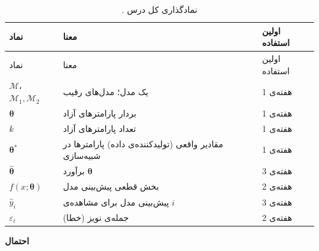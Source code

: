 \begin{longtable}[]{@{}
  >{\raggedright\arraybackslash}p{}
  >{\raggedright\arraybackslash}p{}
  >{\raggedright\arraybackslash}p{}@{}}
\caption{. نمادگذاری کل درس}\tabularnewline
\toprule\noalign{}
\begin{minipage}[b]{\linewidth}\raggedright
نماد
\end{minipage} & \begin{minipage}[b]{\linewidth}\raggedright
معنا
\end{minipage} & \begin{minipage}[b]{\linewidth}\raggedright
اولین استفاده
\end{minipage} \\
\midrule\noalign{}
\endfirsthead
\toprule\noalign{}
\begin{minipage}[b]{\linewidth}\raggedright
نماد
\end{minipage} & \begin{minipage}[b]{\linewidth}\raggedright
معنا
\end{minipage} & \begin{minipage}[b]{\linewidth}\raggedright
اولین استفاده
\end{minipage} \\
\midrule\noalign{}
\endhead
\bottomrule\noalign{}
\endlastfoot
\(\mathcal{M}\)، \(\mathcal{M}_1, \mathcal{M}_2\) & یک مدل؛ مدل‌های رقیب
& هفته‌ی 1 \\
\(\boldsymbol\theta\) & بردار پارامترهای آزاد & هفته‌ی 1 \\
\(k\) & تعداد پارامترهای آزاد & هفته‌ی 1 \\
\(\boldsymbol\theta^\ast\) & مقادیر واقعی (تولیدکننده‌ی داده) پارامترها
در شبیه‌سازی & هفته‌ی 1 \\
\(\hat{\boldsymbol\theta}\) & برآورد \(\boldsymbol\theta\) & هفته‌ی 3 \\
\(f(x;\boldsymbol\theta)\) & بخش قطعی پیش‌بینی مدل & هفته‌ی 2 \\
\(\hat y_i\) & پیش‌بینی مدل برای مشاهده‌ی \(i\) & هفته‌ی 3 \\
\(\varepsilon_i\) & جمله‌ی نویز (خطا) & هفته‌ی 2 \\
\end{longtable}

\textbf{احتمال}

